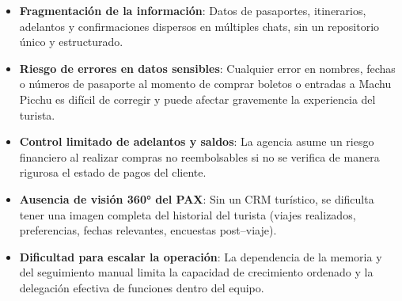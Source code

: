\begin{itemize}
    \item \textbf{Fragmentación de la información}: Datos de pasaportes, itinerarios, adelantos y confirmaciones dispersos en múltiples chats, sin un repositorio único y estructurado.
    \item \textbf{Riesgo de errores en datos sensibles}: Cualquier error en nombres, fechas o números de pasaporte al momento de comprar boletos o entradas a Machu Picchu es difícil de corregir y puede afectar gravemente la experiencia del turista.
    \item \textbf{Control limitado de adelantos y saldos}: La agencia asume un riesgo financiero al realizar compras no reembolsables si no se verifica de manera rigurosa el estado de pagos del cliente.
    \item \textbf{Ausencia de visión 360° del PAX}: Sin un CRM turístico, se dificulta tener una imagen completa del historial del turista (viajes realizados, preferencias, fechas relevantes, encuestas post--viaje).
    \item \textbf{Dificultad para escalar la operación}: La dependencia de la memoria y del seguimiento manual limita la capacidad de crecimiento ordenado y la delegación efectiva de funciones dentro del equipo.
\end{itemize}

